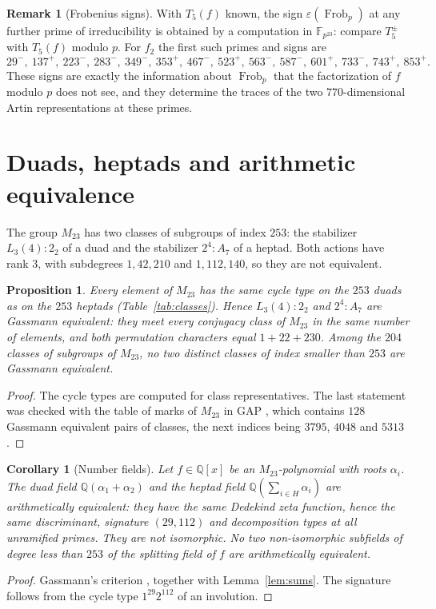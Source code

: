 \documentclass[11pt]{amsart}
\newtheorem{proposition}[theorem]{Proposition}
\newtheorem{corollary}[theorem]{Corollary}
\theoremstyle{definition}
\newtheorem{remark}[theorem]{Remark}
\newcommand{\QQ}{\mathbb{Q}}
\newcommand{\FF}{\mathbb{F}}
\newcommand{\Frob}{\operatorname{Frob}}
\newcommand{\M}{M_{23}}
\begin{document}
\begin{remark}[Frobenius signs]
With $T_5(f)$ known, the sign $\varepsilon(\Frob_p)$ at any further prime of irreducibility is obtained by a computation in $\FF_{p^{23}}$: compare $T_5^{\pm}$ with $T_5(f)$ modulo $p$. For $f_2$ the first such primes and signs are
\[
29^-,\ 137^+,\ 223^-,\ 283^-,\ 349^-,\ 353^+,\ 467^-,\ 523^+,\ 563^-,\ 587^-,\ 601^+,\ 733^-,\ 743^+,\ 853^+ .
\]
These signs are exactly the information about $\Frob_p$ that the factorization of $f$ modulo $p$ does not see, and they determine the traces of the two $770$-dimensional Artin representations at these primes.
\end{remark}

\section{Duads, heptads and arithmetic equivalence}\label{sec:gassmann}

The group $\M$ has two classes of subgroups of index $253$: the stabilizer $L_3(4){:}2_2$ of a duad and the stabilizer $2^4{:}A_7$ of a heptad. Both actions have rank $3$, with subdegrees $1,42,210$ and $1,112,140$, so they are not equivalent.

\begin{proposition}\label{prop:gassmann}
Every element of $\M$ has the same cycle type on the $253$ duads as on the $253$ heptads (Table~\ref{tab:classes}). Hence $L_3(4){:}2_2$ and $2^4{:}A_7$ are Gassmann equivalent: they meet every conjugacy class of $\M$ in the same number of elements, and both permutation characters equal $1+22+230$. Among the $204$ classes of subgroups of $\M$, no two distinct classes of index smaller than $253$ are Gassmann equivalent.
\end{proposition}
\begin{proof}
The cycle types are computed for class representatives. The last statement was checked with the table of marks of $\M$ in GAP \cite{GAP}, which contains $128$ Gassmann equivalent pairs of classes, the next indices being $3795$, $4048$ and $5313$.
\end{proof}

\begin{corollary}[Number fields]\label{cor:fields}
Let $f\in\QQ[x]$ be an $\M$-polynomial with roots $\alpha_i$. The duad field $\QQ(\alpha_1+\alpha_2)$ and the heptad field $\QQ(\sum_{i\in H}\alpha_i)$ are arithmetically equivalent: they have the same Dedekind zeta function, hence the same discriminant, signature $(29,112)$ and decomposition types at all unramified primes. They are not isomorphic. No two non-isomorphic subfields of degree less than $253$ of the splitting field of $f$ are arithmetically equivalent.
\end{corollary}
\begin{proof}
Gassmann's criterion \cite{Gassmann26,Perlis77}, together with Lemma~\ref{lem:sums}. The signature follows from the cycle type $1^{29}2^{112}$ of an involution.
\end{proof}
\end{document}
